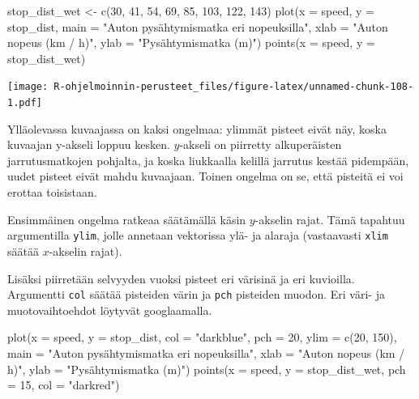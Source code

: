 \documentclass[
]{book}
\newenvironment{Shaded}{\begin{snugshade}}{\end{snugshade}}
\newcommand{\AttributeTok}[1]{\textcolor[rgb]{0.77,0.63,0.00}{#1}}
\newcommand{\DecValTok}[1]{\textcolor[rgb]{0.00,0.00,0.81}{#1}}
\newcommand{\FunctionTok}[1]{\textcolor[rgb]{0.00,0.00,0.00}{#1}}
\newcommand{\NormalTok}[1]{#1}
\newcommand{\OtherTok}[1]{\textcolor[rgb]{0.56,0.35,0.01}{#1}}
\newcommand{\StringTok}[1]{\textcolor[rgb]{0.31,0.60,0.02}{#1}}
\begin{document}
\begin{Shaded}
\begin{Highlighting}[]
\NormalTok{stop\_dist\_wet }\OtherTok{\textless{}{-}} \FunctionTok{c}\NormalTok{(}\DecValTok{30}\NormalTok{, }\DecValTok{41}\NormalTok{, }\DecValTok{54}\NormalTok{, }\DecValTok{69}\NormalTok{, }\DecValTok{85}\NormalTok{, }\DecValTok{103}\NormalTok{, }\DecValTok{122}\NormalTok{, }\DecValTok{143}\NormalTok{)}
\FunctionTok{plot}\NormalTok{(}\AttributeTok{x =}\NormalTok{ speed, }\AttributeTok{y =}\NormalTok{ stop\_dist,}
     \AttributeTok{main =} \StringTok{"Auton pysähtymismatka eri nopeuksilla"}\NormalTok{,}
     \AttributeTok{xlab =} \StringTok{"Auton nopeus (km / h)"}\NormalTok{, }\AttributeTok{ylab =} \StringTok{"Pysähtymismatka (m)"}\NormalTok{)}
\FunctionTok{points}\NormalTok{(}\AttributeTok{x =}\NormalTok{ speed, }\AttributeTok{y =}\NormalTok{ stop\_dist\_wet)}
\end{Highlighting}
\end{Shaded}

\texttt{[image: R-ohjelmoinnin-perusteet\_files/figure-latex/unnamed-chunk-108-1.pdf]}

Ylläolevassa kuvaajassa on kaksi ongelmaa: ylimmät pisteet eivät näy, koska kuvaajan y-akseli loppuu kesken. \(y\)-akseli on piirretty alkuperäisten jarrutusmatkojen pohjalta, ja koska liukkaalla kelillä jarrutus kestää pidempään, uudet pisteet eivät mahdu kuvaajaan. Toinen ongelma on se, että pisteitä ei voi erottaa toisistaan.

Ensimmäinen ongelma ratkeaa säätämällä käsin \(y\)-akselin rajat. Tämä tapahtuu argumentilla \texttt{ylim}, jolle annetaan vektorissa ylä- ja alaraja (vastaavasti \texttt{xlim} säätää \(x\)-akselin rajat).

Lisäksi piirretään selvyyden vuoksi pisteet eri värisinä ja eri kuvioilla. Argumentti \texttt{col} säätää pisteiden värin ja \texttt{pch} pisteiden muodon. Eri väri- ja muotovaihtoehdot löytyvät googlaamalla.

\begin{Shaded}
\begin{Highlighting}[]
\FunctionTok{plot}\NormalTok{(}\AttributeTok{x =}\NormalTok{ speed, }\AttributeTok{y =}\NormalTok{ stop\_dist,}
     \AttributeTok{col =} \StringTok{"darkblue"}\NormalTok{, }\AttributeTok{pch =} \DecValTok{20}\NormalTok{,}
     \AttributeTok{ylim =} \FunctionTok{c}\NormalTok{(}\DecValTok{20}\NormalTok{, }\DecValTok{150}\NormalTok{),}
     \AttributeTok{main =} \StringTok{"Auton pysähtymismatka eri nopeuksilla"}\NormalTok{,}
     \AttributeTok{xlab =} \StringTok{"Auton nopeus (km / h)"}\NormalTok{, }\AttributeTok{ylab =} \StringTok{"Pysähtymismatka (m)"}\NormalTok{)}
\FunctionTok{points}\NormalTok{(}\AttributeTok{x =}\NormalTok{ speed, }\AttributeTok{y =}\NormalTok{ stop\_dist\_wet, }\AttributeTok{pch =} \DecValTok{15}\NormalTok{, }\AttributeTok{col =} \StringTok{"darkred"}\NormalTok{)}
\end{Highlighting}
\end{Shaded}
\end{document}
